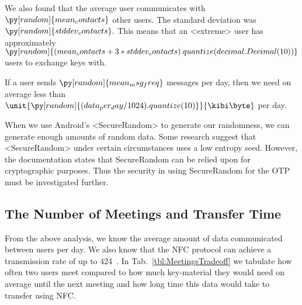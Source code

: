 We also found that the average user communicates with
\(\py[random]{mean_contacts}\)
other users.
The standard deviation was
\(\py[random]{stddev_contacts}.\)
This means that an <extreme> user has approximately
\(\py[random]{(mean_contacts 
+ 3*stddev_contacts).quantize(decimal.Decimal(10))}\)
users to exchange keys with.

\reversemarginpar
{}
\reversemarginpar
If a user sends
\(\py[random]{mean_msg_freq}\)
messages per day, then we need on average less than
\(\unit{\py[random]{(data_per_day/1024).quantize( 10 )}}{\kibi\byte}\)
per day.

When we use Android's <SecureRandom> to generate our randomness, we can 
generate enough amounts of random data.
Some research \cite{AndroidLowEntropyMyth,JavaRandomness} suggest that 
<SecureRandom> under certain circumstances uses a low entropy seed.
However, the documentation states that SecureRandom can be relied upon for 
cryptographic purposes.
Thus the security in using SecureRandom for the \ac{OTP} must be investigated 
further.

\subsection{The Number of Meetings and Transfer Time}
\label{sec:Meetings}
From the above analysis, we know the average amount of data communicated 
between users per day.
We also know that the \ac{NFC} protocol can achieve a transmission rate of up 
to \unit{424}{\kilo\bit\per\second}~\cite{NFCController}.
In Tab.~\ref{tbl:MeetingsTradeoff} we tabulate how often two users meet 
compared to how much key-material they would need on average until the next 
meeting and how long time this data would take to transfer using \ac{NFC}.

